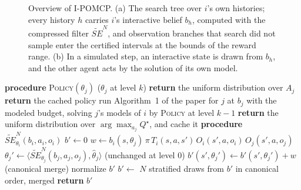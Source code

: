 \documentclass{article}
\newcommand{\SE}{\mathit{SE}}
\newcommand{\SEN}{\widetilde{\SE}^{N}}
\newcommand{\hth}{\hat{\theta}}
\renewcommand{\Pr}{\mathit{Pr}}
\begin{document}
\begin{figure}[h]
{}
\caption{Overview of I-POMCP. (a) The search tree over $i$'s own histories; every history $h$ carries $i$'s interactive belief $b_h$, computed with the compressed filter $\SEN$, and observation branches that search did not sample enter the certified intervals at the bounds of the reward range. (b) In a simulated step, an interactive state is drawn from $b_h$, and the other agent acts by the solution of its own model.}
\label{fig:overview}
\end{figure}

\begin{algorithm}[h]
\caption{Compressed update and modeled solves}
\label{alg:filter}
\begin{algorithmic}[1]
\STATE \textbf{procedure} \textsc{Policy}$(\theta_j)$ \hfill ($\theta_j$ at level $k$)
    \STATE \textbf{return} the uniform distribution over $A_j$
\ENDIF
{}
    \STATE \textbf{return} the cached policy
\ENDIF
\STATE run Algorithm~1 of the paper for $j$ at $b_j$ with the modeled budget, solving $j$'s models of $i$ by \textsc{Policy} at level $k-1$
\STATE \textbf{return} the uniform distribution over $\arg\max_{a_j} Q^\star$, and cache it
\STATE
\STATE \textbf{procedure} $\SEN_{\theta_i}(b_i, a_i, o_i)$
\STATE $b' \leftarrow 0$
    \STATE $w \leftarrow b_i(s, \theta_j)\, \pi\, T_i(s, a, s')\, O_i(s', a, o_i)\, O_j(s', a, o_j)$
    \STATE $\theta_j' \leftarrow \langle \SEN_{\theta_j}(b_j, a_j, o_j), \hth_j \rangle$ \hfill (unchanged at level 0)
    \STATE $b'(s', \theta_j') \leftarrow b'(s', \theta_j') + w$ \hfill (canonical merge)
\ENDFOR
\STATE normalize $b'$
    \STATE $b' \leftarrow$ $N$ stratified draws from $b'$ in canonical order, merged
\ENDIF
\STATE \textbf{return} $b'$
\end{algorithmic}
\end{algorithm}
\end{document}
